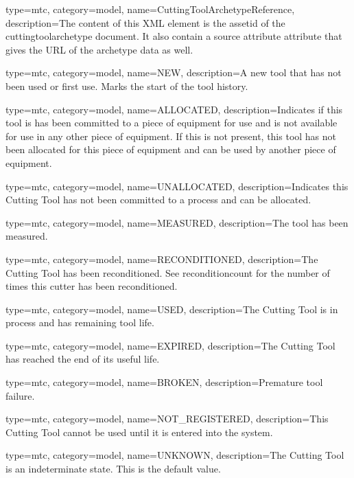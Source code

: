 {
  type=mtc,
  category=model,
  name={CuttingToolArchetypeReference},
  description={The content of this XML element is the \gls{assetid} of the \gls{cuttingtoolarchetype} document. It \MAY also contain a \gls{source attribute} attribute that gives the URL of the archetype data as well.}
}


{
  type=mtc,
  category=model,
  name={NEW},
  description={A new tool that has not been used or first use. Marks the start of the tool history.}
}



{
  type=mtc,
  category=model,
  name={ALLOCATED},
  description={Indicates if this tool is has been committed to a piece of equipment for use and is not available for use in any other piece of equipment. If this is not present, this tool has not been allocated for this piece of equipment and can be used by another piece of equipment.}
}


{
  type=mtc,
  category=model,
  name={UNALLOCATED},
  description={Indicates this Cutting Tool has not been committed to a process and can be allocated.}
}


{
  type=mtc,
  category=model,
  name={MEASURED},
  description={The tool has been measured.}
}


{
  type=mtc,
  category=model,
  name={RECONDITIONED},
  description={The Cutting Tool has been reconditioned. See \gls{reconditioncount} for the number of times this cutter has been reconditioned.}
}


{
  type=mtc,
  category=model,
  name={USED},
  description={The Cutting Tool is in process and has remaining tool life.}
}


{
  type=mtc,
  category=model,
  name={EXPIRED},
  description={The Cutting Tool has reached the end of its useful life.}
}


{
  type=mtc,
  category=model,
  name={BROKEN},
  description={Premature tool failure.}
}


{
  type=mtc,
  category=model,
  name={NOT\_REGISTERED},
  description={This Cutting Tool cannot be used until it is entered into the system.}
}


{
  type=mtc,
  category=model,
  name={UNKNOWN},
  description={The Cutting Tool is an indeterminate state. This is the default value.}
}



